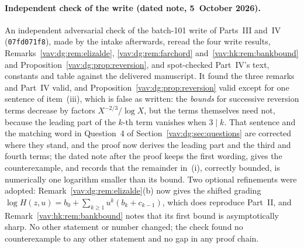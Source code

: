 \documentclass[11pt]{article}
\theoremstyle{remark}\newtheorem{remark}[theorem]{Remark}
\begin{document}
\paragraph{Independent check of the write (dated note, 5~October 2026).}
An independent adversarial check of the batch-101 write of Parts~III
and~IV (\texttt{07fd071f8}), made by the intake afterwards, reread the four
write results, Remarks~\ref{vav:dg:rem:elizalde}, \ref{vav:dg:rem:farchord}
and~\ref{vav:hk:rem:bankbound} and
Proposition~\ref{vav:dg:prop:reversion}, and spot-checked Part~IV's text,
constants and table against the delivered manuscript. It found the three
remarks and Part~IV valid, and Proposition~\ref{vav:dg:prop:reversion}
valid except for one sentence of item~(iii), which is false as written:
the \emph{bounds} for successive reversion terms decrease by factors
$X^{-2/3}/\log X$, but the terms themselves need not, because the leading
part of the $k$-th term vanishes when $3\mid k$. That sentence and the
matching word in Question~4 of Section~\ref{vav:dg:sec:questions} are
corrected where they stand, and the proof now derives the leading part and
the third and fourth terms; the dated note after the proof keeps the first
wording, gives the counterexample, and records that the remainder in~(i),
correctly bounded, is numerically one logarithm smaller than its bound.
Two optional refinements were adopted:
Remark~\ref{vav:dg:rem:elizalde}(b) now gives the shifted grading
$\log H(z,u)=b_0+\sum_{k\ge1}u^k(b_k+c_{k-1})$, which does reproduce
Part~II, and Remark~\ref{vav:hk:rem:bankbound} notes that its first bound
is asymptotically sharp. No other statement or number changed; the check
found no counterexample to any other statement and no gap in any proof
chain.
\end{document}
